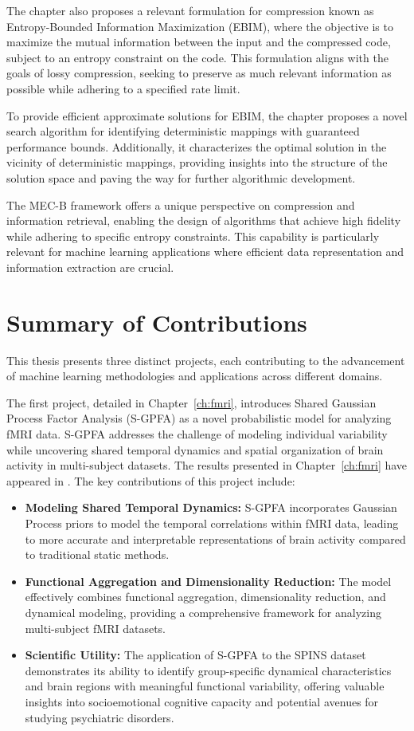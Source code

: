 The chapter also proposes a relevant formulation for compression known as Entropy-Bounded Information Maximization (EBIM), where the objective is to maximize the mutual information between the input and the compressed code, subject to an entropy constraint on the code. This formulation aligns with the goals of lossy compression, seeking to preserve as much relevant information as possible while adhering to a specified rate limit.

To provide efficient approximate solutions for EBIM, the chapter proposes a novel search algorithm for identifying deterministic mappings with guaranteed performance bounds. Additionally, it characterizes the optimal solution in the vicinity of deterministic mappings, providing insights into the structure of the solution space and paving the way for further algorithmic development.

The MEC-B framework offers a unique perspective on compression and information retrieval, enabling the design of algorithms that achieve high fidelity while adhering to specific entropy constraints. This capability is particularly relevant for machine learning applications where efficient data representation and information extraction are crucial.


\section{Summary of Contributions}

This thesis presents three distinct projects, each contributing to the advancement of machine learning methodologies and applications across different domains. 

The first project, detailed in Chapter~\ref{ch:fmri}, introduces Shared Gaussian Process Factor Analysis (S-GPFA) as a novel probabilistic model for analyzing fMRI data. S-GPFA addresses the challenge of modeling individual variability while uncovering shared temporal dynamics and spatial organization of brain activity in multi-subject datasets. The results presented in Chapter~\ref{ch:fmri} have appeared in \cite{ebrahimi2023time}. The key contributions of this project include:

\begin{itemize}
    \item \textbf{Modeling Shared Temporal Dynamics:} S-GPFA incorporates Gaussian Process priors to model the temporal correlations within fMRI data, leading to more accurate and interpretable representations of brain activity compared to traditional static methods.
    \item \textbf{Functional Aggregation and Dimensionality Reduction:} The model effectively combines functional aggregation, dimensionality reduction, and dynamical modeling, providing a comprehensive framework for analyzing multi-subject fMRI datasets. 
    \item \textbf{Scientific Utility:}  The application of S-GPFA to the SPINS dataset demonstrates its ability to identify group-specific dynamical characteristics and brain regions with meaningful functional variability, offering valuable insights into socioemotional cognitive capacity and potential avenues for studying psychiatric disorders. 
\end{itemize}

